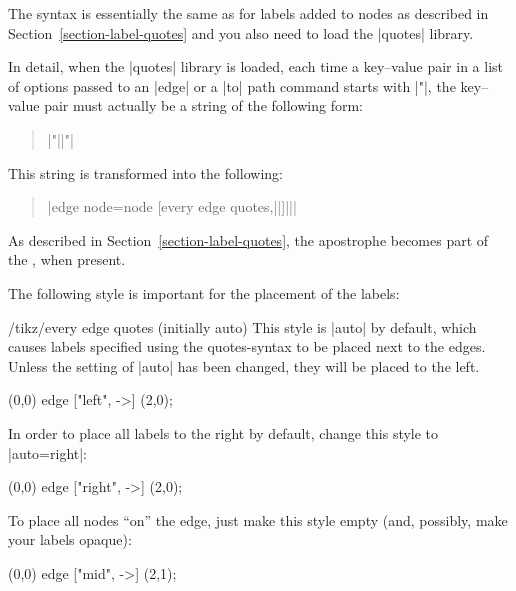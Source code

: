 The syntax is essentially the same as for labels added to nodes as described in
Section~\ref{section-label-quotes} and you also need to load the |quotes|
library.

In detail, when the |quotes| library is loaded, each time a key--value pair in
a list of options passed to an |edge| or a |to| path command starts with |"|,
the key--value pair must actually be a string of the following form:
%
\begin{quote}
    |"||"|
\end{quote}
%
This string is transformed into the following:
%
\begin{quote}
    |edge node=node [every edge quotes,||]{||}|
\end{quote}
%
As described in Section~\ref{section-label-quotes}, the apostrophe becomes part
of the , when present.

The following style is important for the placement of the labels:

\begin{stylekey}{/tikz/every edge quotes (initially auto)}
    This style is |auto| by default, which causes labels specified using the
    quotes-syntax to be placed next to the edges. Unless the setting of |auto|
    has been changed, they will be placed to the left.
\begin{codeexample}[preamble={\usetikzlibrary{quotes}}]
\tikz \draw (0,0) edge ["left", ->] (2,0);
\end{codeexample}

    In order to place all labels to the right by default, change this style to
    |auto=right|:
\begin{codeexample}[preamble={\usetikzlibrary{quotes}}]
\tikz [every edge quotes/.style={auto=right}]
  \draw (0,0) edge ["right", ->] (2,0);
\end{codeexample}

    To place all nodes ``on'' the edge, just make this style empty (and,
    possibly, make your labels opaque):
\begin{codeexample}[preamble={\usetikzlibrary{quotes}}]
\tikz [every edge quotes/.style={fill=white,font=\footnotesize}]
  \draw (0,0) edge ["mid", ->] (2,1);
\end{codeexample}
\end{stylekey}

